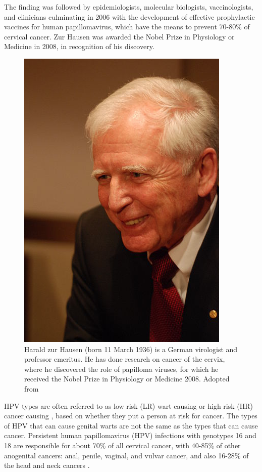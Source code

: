 
The finding was followed by epidemiologists, molecular biologists, vaccinologists, and clinicians culminating in 2006 with the development of effective prophylactic vaccines for human papillomavirus, which have the means to prevent 70-80\% of cervical cancer. Zur Hausen was awarded the Nobel Prize in Physiology or Medicine in 2008, in recognition of his discovery.

\begin{figure}[ht]
	\centering
	\includegraphics[scale=0.7]{IMG/zurHausen.png}
	\caption{Harald zur Hausen (born 11 March 1936) is a German virologist and professor emeritus. He has done research on cancer of the cervix, where he discovered the role of papilloma viruses, for which he received the Nobel Prize in Physiology or Medicine 2008. Adopted from \cite{haraldZur2010}}
	\label{zurHausen}
\end{figure} 

HPV types are often referred to as low risk (LR) wart causing or high risk (HR) cancer causing \cite{Clifford1157}, based on whether they put a person at risk for cancer.  The types of HPV that can cause genital warts are not the same as the types that can cause cancer.
Persistent human papillomavirus (HPV) infections with genotypes 16 and 18 are responsible for about 70\% of all cervical cancer, with 40-85\% of other anogenital cancers: anal, penile, vaginal, and vulvar cancer, and also 16-28\% of the head and neck cancers \cite{olsen2015revisiting}.

